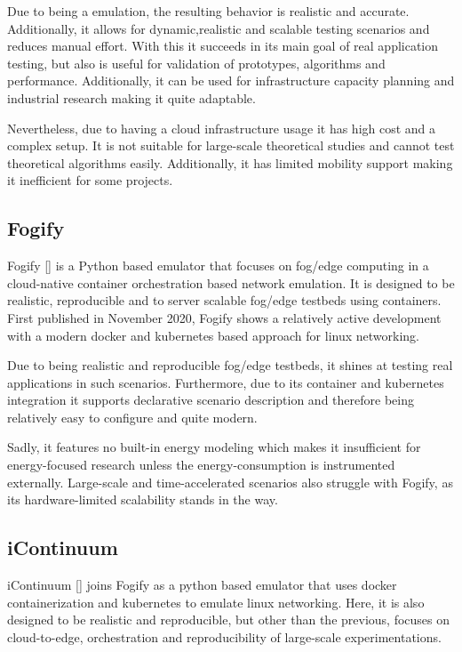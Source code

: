 Due to being a emulation, the resulting behavior is realistic and accurate. 
Additionally, it allows for dynamic,realistic and scalable testing scenarios and reduces manual effort.
With this it succeeds in its main goal of real application testing, but also is useful for validation of prototypes, algorithms and performance.
Additionally, it can be used for infrastructure capacity planning and industrial research making it quite adaptable.

Nevertheless, due to having a cloud infrastructure usage it has high cost and a complex setup.
It is not suitable for large-scale theoretical studies and cannot test theoretical algorithms easily.
Additionally, it has limited mobility support making it inefficient for some projects.

\subsection{Fogify}\label{sec:Fogify}
Fogify [\cite{sim-fogify}] is a Python based emulator that focuses on fog/edge computing in a cloud-native container orchestration based network emulation.
It is designed to be realistic, reproducible and to server scalable fog/edge testbeds using containers.
First published in November 2020, Fogify shows a relatively active development with a modern docker and kubernetes based approach for linux networking.

Due to being realistic and reproducible fog/edge testbeds, it shines at testing real applications in such scenarios.
Furthermore, due to its container and kubernetes integration it supports declarative scenario description and therefore being relatively easy to configure and quite modern.

Sadly, it features no built-in energy modeling which makes it insufficient for energy-focused research unless the energy-consumption is instrumented externally.
Large-scale and time-accelerated scenarios also struggle with Fogify, as its hardware-limited scalability stands in the way.

\subsection{iContinuum}\label{sec:iContinuum}
iContinuum [\cite{sim-icontinuum}] joins Fogify as a python based emulator that uses docker containerization and kubernetes to emulate linux networking.
Here, it is also designed to be realistic and reproducible, but other than the previous, focuses on cloud-to-edge, orchestration and reproducibility of large-scale experimentations. 

